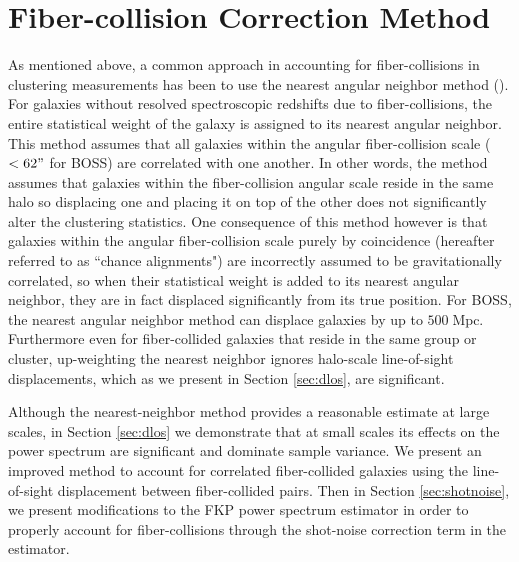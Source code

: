\documentclass{emulateapj}
\begin{document}
\section{Fiber-collision Correction Method} \label{sec:fc_corr}
As mentioned above, a common approach in accounting for fiber-collisions in clustering measurements has been to use the nearest angular neighbor method (\citealt{Zehavi:2002aa, Berlind:2006aa, Anderson:2012aa}). For galaxies without resolved spectroscopic redshifts due to fiber-collisions, the entire statistical weight of the galaxy is assigned to its nearest angular neighbor. This method assumes that all galaxies within the angular fiber-collision scale ($< 62 "$ for BOSS) are correlated with one another. In other words, the method assumes that galaxies within the fiber-collision angular scale reside in the same halo so displacing one and placing it on top of the other does not significantly alter the clustering statistics. One consequence of this method however is that galaxies within the angular fiber-collision scale purely by coincidence (hereafter referred to as ``chance alignments") are incorrectly assumed to be gravitationally correlated, so when their statistical weight is added to its nearest angular neighbor, they are in fact displaced significantly from its true position. For BOSS, the nearest angular neighbor method can displace galaxies by up to $500 \;\mathrm{Mpc}$. Furthermore even for fiber-collided galaxies that reside in the same group or cluster, up-weighting the nearest neighbor ignores halo-scale line-of-sight displacements, which as we present in Section \ref{sec:dlos}, are significant. 

Although the nearest-neighbor method provides a reasonable estimate at large scales, in Section \ref{sec:dlos} we demonstrate that at small scales its effects on the power spectrum are significant and dominate sample variance. We present an improved method to account for correlated fiber-collided galaxies using the line-of-sight displacement between fiber-collided pairs. Then in Section \ref{sec:shotnoise}, we present modifications to the FKP power spectrum estimator in order to properly account for fiber-collisions through the shot-noise correction term in the estimator. 

\end{document}
